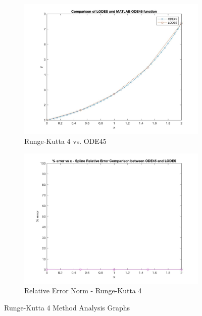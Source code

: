 \documentclass[12pt, titlepage]{article}
\begin{document}
\begin{figure}[H]
\centering
\begin{subfigure}{.55\textwidth}
  \centering
  \includegraphics[width=\linewidth]{images/Test2/4LODESvsMATLABPlot.jpg}
  \caption{Runge-Kutta 4 vs. ODE45}
  \label{fig:rk2a}
\end{subfigure}%
\begin{subfigure}{.55\textwidth}
  \centering
  \includegraphics[width=\linewidth]{images/Test2/4RelativeErrorPlot.jpg}
  \caption{Relative Error Norm - Runge-Kutta 4}
  \label{fig:rk2b}
\end{subfigure}
\caption{Runge-Kutta 4 Method Analysis Graphs}
\label{fig:rk2}
\end{figure}
\end{document}
